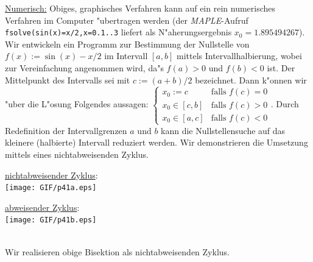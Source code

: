 \underline{Numerisch:} Obiges, graphisches Verfahren kann auf ein
rein numerisches Verfahren im Computer "ubertragen werden
(der \textit{MAPLE}-Aufruf \texttt{fsolve(sin(x)=x/2,x=0.1..3}
liefert als N"aherungsergebnis $x_0 = 1.895494267$\enspace).
Wir entwickeln ein Programm zur Bestimmung der Nullstelle
von $f(x) := \sin(x) - x/2$ im Intervall $[a,b]$
mittels Intervallhalbierung, wobei zur Vereinfachung
angenommen wird, da"s $f(a) >0$ und $f(b)<0$ ist.
Der Mittelpunkt des Intervalls sei mit $c:=(a+b)/2$ bezeichnet.
Dann k"onnen wir "uber die L"osung Folgendes aussagen:
$
\begin{cases}
 x_0 := c 	& \text{falls } f(c) = 0 \\
 x_0 \in [c,b]	& \text{falls } f(c) > 0 \\
 x_0 \in [a,c]	& \text{falls } f(c) < 0
\end{cases}
$\enspace.
%
Durch Redefinition der Intervallgrenzen $a$ und $b$ kann die
Nullstellensuche auf das kleinere (halbierte) Intervall
reduziert werden. Wir demonstrieren die Umsetzung mittels
eines nichtabweisenden Zyklus.

% 
% 
% 
\begin{minipage}{0.45\textwidth}
 \underline{nichtabweisender Zyklus}: \\
 \texttt{[image: GIF/p41a.eps]}
\end{minipage}
\hfill
\begin{minipage}{0.45\textwidth}
 \underline{abweisender Zyklus}: \\
 \texttt{[image: GIF/p41b.eps]}
\end{minipage}
\\
Wir realisieren obige Bisektion als nichtabweisenden Zyklus.
%
%

